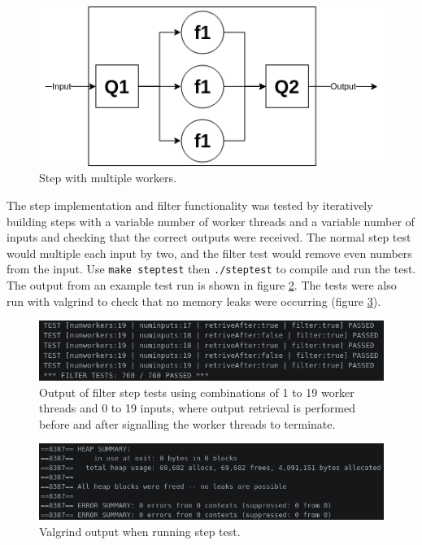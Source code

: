 \documentclass[12pt]{article}
\def\code#1{\texttt{#1}}
\begin{document}
\begin{figure}[!ht]
	\centering 
	\includegraphics[width=0.8\linewidth]{images/farm}
	\caption{Step with multiple workers.}
	\label{fig:multiplestep}
\end{figure}

The step implementation and filter functionality was tested by iteratively building steps with a variable number of worker threads and a variable number of inputs and checking that the correct outputs were received. The normal step test would multiple each input by two, and the filter test would remove even numbers from the input. Use \code{make steptest} then \code{./steptest} to compile and run the test. The output from an example test run is shown in figure \ref{fig:steptest}. The tests were also run with valgrind to check that no memory leaks were occurring (figure \ref{fig:stepgrind}).

\begin{figure}[!ht]
	\centering 
	\includegraphics[width=\linewidth]{images/steptest}
	\caption{Output of filter step tests using combinations of 1 to 19 worker threads and 0 to 19 inputs, where output retrieval is performed before and after signalling the worker threads to terminate.}
	\label{fig:steptest}
\end{figure}

\begin{figure}[!ht]
	\centering 
	\includegraphics[width=\linewidth]{images/stepgrind}
	\caption{Valgrind output when running step test.}
	\label{fig:stepgrind}
\end{figure}
\end{document}
